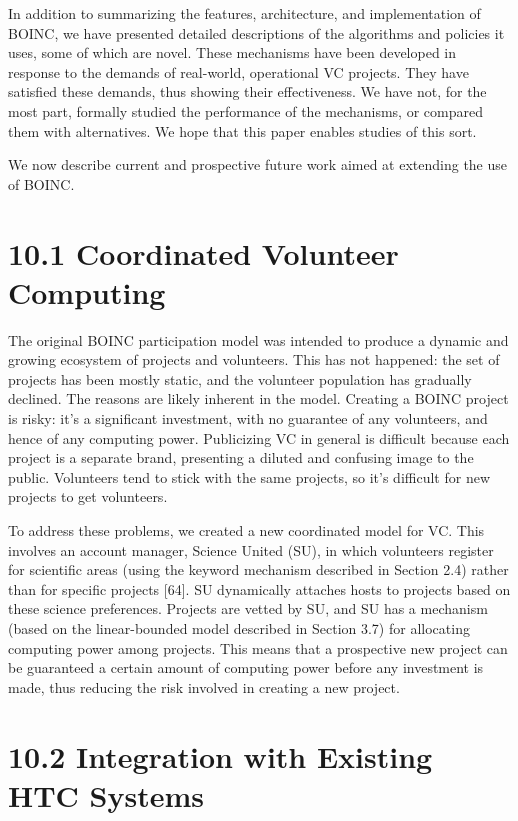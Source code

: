 \documentclass[
]{article}
\begin{document}
In addition to summarizing the features, architecture, and
implementation of BOINC, we have presented detailed descriptions of the
algorithms and policies it uses, some of which are novel. These
mechanisms have been developed in response to the demands of real-world,
operational VC projects. They have satisfied these demands, thus showing
their effectiveness. We have not, for the most part, formally studied
the performance of the mechanisms, or compared them with alternatives.
We hope that this paper enables studies of this sort.

We now describe current and prospective future work aimed at extending
the use of BOINC.

\section{10.1 Coordinated Volunteer
Computing}\label{coordinated-volunteer-computing}

The original BOINC participation model was intended to produce a dynamic
and growing ecosystem of projects and volunteers. This has not happened:
the set of projects has been mostly static, and the volunteer population
has gradually declined. The reasons are likely inherent in the model.
Creating a BOINC project is risky: it's a significant investment, with
no guarantee of any volunteers, and hence of any computing power.
Publicizing VC in general is difficult because each project is a
separate brand, presenting a diluted and confusing image to the public.
Volunteers tend to stick with the same projects, so it's difficult for
new projects to get volunteers.

To address these problems, we created a new coordinated model for VC.
This involves an account manager, Science United (SU), in which
volunteers register for scientific areas (using the keyword mechanism
described in Section 2.4) rather than for specific projects {[}64{]}. SU
dynamically attaches hosts to projects based on these science
preferences. Projects are vetted by SU, and SU has a mechanism (based on
the linear-bounded model described in Section 3.7) for allocating
computing power among projects. This means that a prospective new
project can be guaranteed a certain amount of computing power before any
investment is made, thus reducing the risk involved in creating a new
project.

\section{10.2 Integration with Existing HTC
Systems}\label{integration-with-existing-htc-systems}
\end{document}

